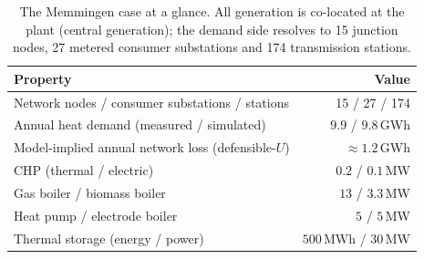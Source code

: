 \begin{table}[t]
\centering
\caption{The Memmingen case at a glance. All generation is co-located at the plant (central
generation); the demand side resolves to 15 junction nodes, 27 metered consumer substations and
174 transmission stations.}
\label{tab:casesummary}
\begin{tabular}{lr}
\hline
Property & Value \\
\hline
Network nodes / consumer substations / stations & 15 / 27 / 174 \\
Annual heat demand (measured / simulated) & $9.9$ / $9.8$\,GWh \\
Model-implied annual network loss (defensible-$U$) & $\approx 1.2$\,GWh \\
CHP (thermal / electric) & $0.2$ / $0.1$\,MW \\
Gas boiler / biomass boiler & $13$ / $3.3$\,MW \\
Heat pump / electrode boiler & $5$ / $5$\,MW \\
Thermal storage (energy / power) & $500$\,MWh / $30$\,MW \\
\hline
\end{tabular}
\end{table}

